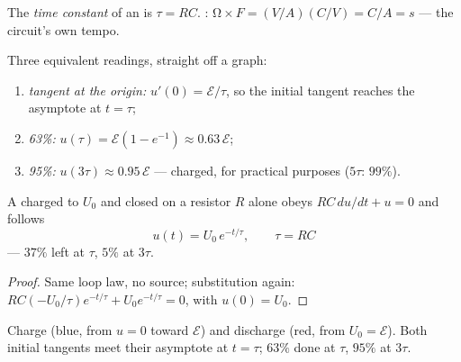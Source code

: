 \begin{definition}\label{def:g12:rc-rl-circuits:tau}
The \emph{time constant} of an  is
$\tau = RC$. : $\unit{\ohm} \times \unit{F} =
(\unit{V/A})(\unit{C/V}) = \unit{C/A} = \unit{s}$ --- the circuit's
own tempo.
\end{definition}

\begin{method}\label{met:g12:rc-rl-circuits:reading}
Three equivalent readings, straight off a graph:
\begin{enumerate}
  \item \emph{tangent at the origin:} $u'(0) = \mathcal{E}/\tau$, so
        the initial tangent reaches the asymptote at $t = \tau$;
  \item \emph{63\%:} $u(\tau) = \mathcal{E}(1 - e^{-1}) \approx
        0.63\,\mathcal{E}$;
  \item \emph{95\%:} $u(3\tau) \approx 0.95\,\mathcal{E}$ --- charged,
        for practical purposes ($5\tau$: $99\%$).
\end{enumerate}
\end{method}

\begin{proposition}[Discharge]\label{prop:g12:rc-rl-circuits:discharge}
A  charged to $U_0$ and closed on a resistor $R$ alone obeys
$RC\,du/dt + u = 0$ and follows
\[
u(t) = U_0\,e^{-t/\tau}, \qquad \tau = RC
\]
--- $37\%$ left at $\tau$, $5\%$ at $3\tau$.
\end{proposition}

\begin{proof}
Same loop law, no source; substitution again:
$RC(-U_0/\tau)e^{-t/\tau} + U_0 e^{-t/\tau} = 0$, with $u(0) = U_0$.
\end{proof}

\begin{omfigure}

{\small Charge (blue, from $u = 0$ toward $\mathcal{E}$) and discharge
(red, from $U_0 = \mathcal{E}$). Both initial tangents meet their
asymptote at $t = \tau$; $63\%$ done at $\tau$, $95\%$ at $3\tau$.}
\end{omfigure}

